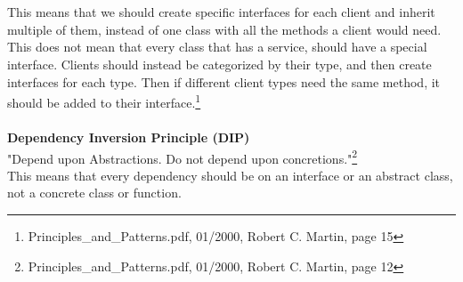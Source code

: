 \\
\\
This means that we should create specific interfaces for each client and inherit multiple of them, instead of one class with all the methods a client would need.
This does not mean that every class that has a service, should have a special interface. Clients should instead be categorized by their type, and then create interfaces for each type. Then if different client types need the same method, it should be added to their interface.\footnote{Principles\_and\_Patterns.pdf, 01/2000, Robert C. Martin, page 15}
\\
\\
\textbf{Dependency Inversion Principle (DIP)}
\\
"Depend upon Abstractions. Do not depend upon concretions."\footnote{Principles\_and\_Patterns.pdf, 01/2000, Robert C. Martin, page 12}
\\
This means that every dependency should be on an interface or an abstract class, not a concrete class or function.
\\
\newpage
